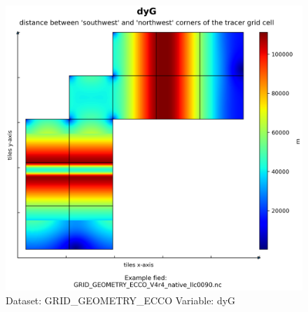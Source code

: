 \begin{figure}[H]
\centering
\includegraphics[scale=0.55]{../images/plots/native_plots_coords/Geometry_Parameters_for_the_Lat-Lon-Cap_90_(llc90)_Native_Model_Grid_(Version_4_Release_4)/dyG.png}
\caption{Dataset: GRID\_GEOMETRY\_ECCO Variable: dyG}
\label{tab:table-GRID_GEOMETRY_ECCO_dyG-Plot}
\end{figure}
\pagebreak
